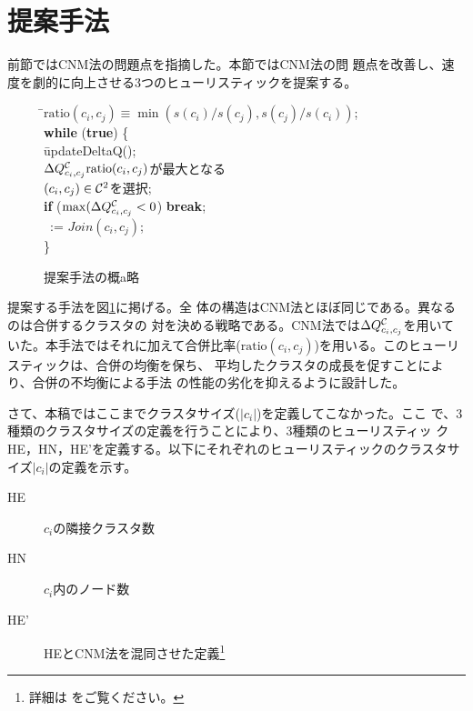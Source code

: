 \documentclass [a4j,11pt] {jsarticle}
\begin{document}
\section {提案手法}
\label {sect: algorithm}

前節ではCNM法の問題点を指摘した。本節ではCNM法の問
題点を改善し、速度を劇的に向上させる3つのヒューリスティックを提案する。

\begin {figure}
\begin {tabbing}
\hspace{.3\linewidth}\=$\mathrm {ratio}(c_i,c_j) \equiv \min(s(c_i)/s(c_j), s(c_j)/s(c_i))$; \\
\>\textbf {while} (\textbf {true}) \{\\
\>\quad\= updateDeltaQ(); \\
\>\>$\Delta Q^{{\cal C}}_{c_i,c_j}\mathrm {ratio}(c_i,c_j)$が最大となる\\
\>\>\quad $(c_i, c_j) \in {\cal C}^2$を選択;\\
\>\>\textbf {if} ($\max(\Delta Q^{{\cal C}}_{c_i,c_j} < 0$) \textbf {break};\\
\>\>\clustering\ := $\mathit {Join}(c_i, c_j)$;\\
\>\}
\end {tabbing}
  \caption {提案手法の概a略}
  \label {fig: tw algorithm}
\end {figure}

提案する手法を図\ref {fig: tw algorithm}に掲げる。全
体の構造はCNM法とほぼ同じである。異なるのは合併するクラスタの
対を決める戦略である。CNM法では$\Delta Q^{{\cal C}}_{c_i,c_j}$を用いていた。本手法ではそれに加えて合併比率($\mathrm
{ratio}(c_i, c_j)$)を用いる。このヒューリスティックは、合併の均衡を保ち、
平均したクラスタの成長を促すことにより、合併の不均衡による手法
の性能の劣化を抑えるように設計した。

さて、本稿ではここまでクラスタサイズ($|c_i|$)を定義してこなかった。ここ
で、3種類のクラスタサイズの定義を行うことにより、3種類のヒューリスティッ
クHE，HN，HE'を定義する。以下にそれぞれのヒューリスティックのクラスタサ
イズ$|c_i|$の定義を示す。

\begin{description}
	\item[HE]  $c_i$の隣接クラスタ数
	\item[HN]  $c_i$内のノード数
	\item[HE']  HEとCNM法を混同させた定義\footnote{詳細は \cite{Wakita07}をご覧ください。}
\end{description}
\end{document}
